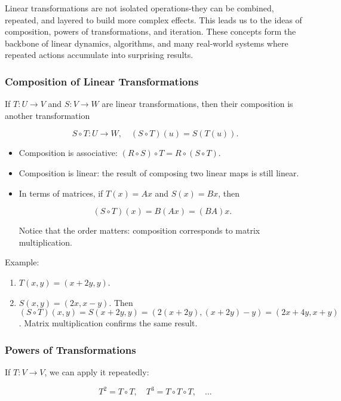 \documentclass[
  letterpaper,
  DIV=11,
  numbers=noendperiod]{scrreprt}
\providecommand{\tightlist}{%
  \setlength{\itemsep}{0pt}\setlength{\parskip}{0pt}}
\begin{document}
Linear transformations are not isolated operations-they can be combined,
repeated, and layered to build more complex effects. This leads us to
the ideas of composition, powers of transformations, and iteration.
These concepts form the backbone of linear dynamics, algorithms, and
many real-world systems where repeated actions accumulate into
surprising results.

\subsubsection{Composition of Linear
Transformations}\label{composition-of-linear-transformations}

If \(T: U \to V\) and \(S: V \to W\) are linear transformations, then
their composition is another transformation

\[
S \circ T : U \to W, \quad (S \circ T)(u) = S(T(u)).
\]

\begin{itemize}
\item
  Composition is associative:
  \((R \circ S) \circ T = R \circ (S \circ T)\).
\item
  Composition is linear: the result of composing two linear maps is
  still linear.
\item
  In terms of matrices, if \(T(x) = Ax\) and \(S(x) = Bx\), then

  \[
  (S \circ T)(x) = B(Ax) = (BA)x.
  \]

  Notice that the order matters: composition corresponds to matrix
  multiplication.
\end{itemize}

Example:

\begin{enumerate}
\def\labelenumi{\arabic{enumi}.}
\tightlist
\item
  \(T(x,y) = (x+2y, y)\).
\item
  \(S(x,y) = (2x, x-y)\). Then
  \((S \circ T)(x,y) = S(x+2y,y) = (2(x+2y), (x+2y)-y) = (2x+4y, x+y)\).
  Matrix multiplication confirms the same result.
\end{enumerate}

\subsubsection{Powers of
Transformations}\label{powers-of-transformations}

If \(T: V \to V\), we can apply it repeatedly:

\[
T^2 = T \circ T, \quad T^3 = T \circ T \circ T, \quad \dots
\]
\end{document}
